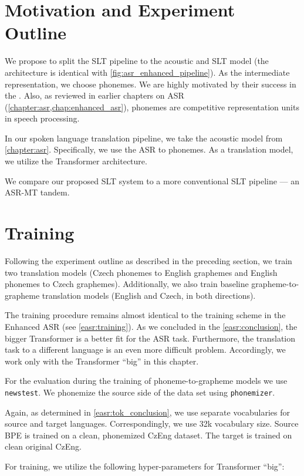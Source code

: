 \section{Motivation and Experiment Outline}
\label{slt:outline}
We propose to split the SLT pipeline to the acoustic and SLT model (the architecture is identical with \cref{fig:asr_enhanced_pipeline}). As the intermediate representation, we choose phonemes. We are highly motivated by their success in the . Also, as reviewed in earlier chapters on ASR (\cref{chapter:asr,chap:enhanced_asr}), phonemes are competitive representation units in speech processing.  

In our spoken language translation pipeline, we take the acoustic model from \cref{chapter:asr}. Specifically, we use the ASR to phonemes. As a translation model, we utilize the Transformer architecture.

We compare our proposed SLT system to a more conventional SLT pipeline --- an ASR-MT tandem.

\section{Training}
\label{slt:training}
Following the experiment outline as described in the preceding section, we train two translation models (Czech phonemes to English graphemes and English phonemes to Czech graphemes). Additionally, we also train baseline grapheme-to-grapheme translation models (English and Czech, in both directions). 

The training procedure remains almost identical to the training scheme in the Enhanced ASR (see \cref{easr:training}). As we concluded in the \cref{easr:conclusion}, the bigger Transformer is a better fit for the ASR task. Furthermore, the translation task to a different language is an even more difficult problem. Accordingly, we work only with the Transformer ``big'' in this chapter.

For the evaluation during the training of phoneme-to-grapheme models we use \texttt{news\-test}. We phonemize the source side of the data set using \texttt{phonemizer}.

Again, as determined in \cref{easr:tok_conclusion}, we use separate vocabularies for source and target languages. Correspondingly, we use 32k vocabulary size. Source BPE is trained on a clean, phonemized CzEng dataset. The target is trained on clean original CzEng.

For training, we utilize the following hyper-parameters for Transformer ``big'':\\

